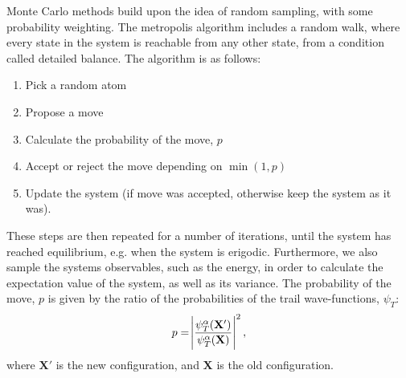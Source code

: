 \documentclass[a4paper]{article}
\newcommand{\newparagraph}{\vspace{.5cm}\noindent}
\begin{document}
\newparagraph
Monte Carlo methods build upon the idea of random sampling, with some probability weighting.
The metropolis algorithm includes a random walk, where every state in the system is reachable from any other state, from a condition called detailed balance.
The algorithm is as follows:
\begin{enumerate}
    \item Pick a random atom
    \item Propose a move
    \item Calculate the probability of the move, $p$ 
    \item Accept or reject the move depending on $\min\left(1, p\right)$
    \item Update the system (if move was accepted, otherwise keep the system as it was).
\end{enumerate}These steps are then repeated for a number of iterations, until the system has reached equilibrium, e.g. when the system is erigodic.
Furthermore, we also sample the systems observables, such as the energy, in order to calculate the expectation value of the system, as well as its variance.
The probability of the move, $p$ is given by the ratio of the probabilities of the trail wave-functions, $\psi_T$:
\begin{align}
    p = \abs{\frac{\psi_T^\alpha(\mathbf{X}')}{\psi_T^{\alpha}(\mathbf{X})}}^2,\label{eq: probability of move}
\end{align}where $\mathbf{X}'$ is the new configuration, and $\mathbf{X}$ is the old configuration.
\end{document}

